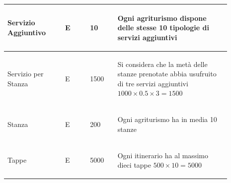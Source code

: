 \documentclass[12pt,a4paper]{article}
\begin{document}
\begin{center}
\begin{longtable}{|p{0.23\linewidth}|p{0.1\linewidth}|p{0.11\linewidth}|p{0.45\linewidth}|}
\hline
Servizio Aggiuntivo
 & 
\begin{center}\vspace{-25pt}E\end{center}
 & 
\begin{center}\vspace{-25pt}10\end{center}
 & 
\begin{flushleft}\vspace{-25pt}Ogni agriturismo dispone delle stesse 10 tipologie di servizi aggiuntivi\end{flushleft}
\\

\hline
Servizio per Stanza
 & 
\begin{center}\vspace{-25pt}E\end{center}
 & 
\begin{center}\vspace{-25pt}1500\end{center}
 & 
\begin{flushleft}\vspace{-25pt}Si considera che la metà delle stanze prenotate abbia usufruito di tre servizi aggiuntivi $1000\times 0.5 \times 3 = 1500$\end{flushleft}
\\

\hline
Stanza
 & 
\begin{center}\vspace{-25pt}E\end{center}
 & 
\begin{center}\vspace{-25pt}200\end{center}
 & 
\begin{flushleft}\vspace{-25pt}Ogni agriturismo ha in media 10 stanze\end{flushleft}
\\

\hline
Tappe
 & 
\begin{center}\vspace{-25pt}E\end{center}
 & 
\begin{center}\vspace{-25pt}5000\end{center}
 & 
\begin{flushleft}\vspace{-25pt}Ogni itinerario ha al massimo dieci tappe $500\times 10= 5000$\end{flushleft}
\\


\end{longtable}
\end{center}
\end{document}
